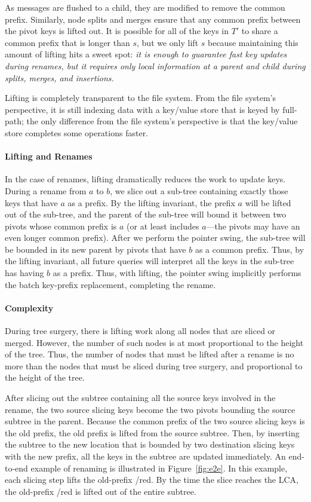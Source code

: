 As messages are flushed to a child, they
are modified to remove the common prefix.
Similarly, node splits and merges ensure that
any common prefix between the pivot keys is lifted out.
It is possible for all of the keys in $T'$ to
share a common prefix that is longer than $s$,  but we only lift
$s$ because maintaining this amount of lifting hits a sweet spot: \textit{it
is enough to guarantee fast key updates during renames, but it
requires only local information at a parent and child  
during splits, merges, and insertions.}

Lifting  is completely transparent to the file system.
From the file system's perspective, it is still indexing data with a
key/value store that is keyed by full-path; the only difference from the file
system's perspective is that the key/value store completes some
operations faster.

\paragraph{Lifting and Renames}
In the case of renames, lifting dramatically reduces the work to update
keys.  During a rename from $a$ to $b$, we slice out a sub-tree
containing exactly those keys that have $a$ as a prefix.  By the
lifting invariant, the prefix $a$ will be lifted out of the sub-tree,
and the parent of the sub-tree will bound it between two pivots whose
common prefix is $a$ (or at least includes $a$---the pivots may have
an even longer common prefix).  After we perform the pointer swing,
the sub-tree will be bounded in its new parent by pivots that have $b$
as a common prefix.  Thus, by the lifting invariant, all future queries
will interpret all the keys in the sub-tree has having $b$ as a prefix.
Thus, with lifting, the pointer swing implicitly performs the batch key-prefix
replacement, completing the rename.

\paragraph{Complexity} During tree surgery, there is lifting work
along all nodes that are sliced or merged.  However, the number of
such nodes is at most proportional to the height of the tree.
Thus, the number of nodes that must be lifted after a rename is no more than
the nodes that must be sliced during tree surgery, and proportional to the height
of the tree.

After slicing out the subtree containing all the source keys involved in the rename,
the two source slicing keys become the two pivots bounding the source subtree in the
parent.
Because the common prefix of the two source slicing keys is the old prefix,
the old prefix is lifted from the source subtree.
Then, by inserting the subtree
to the new location that is bounded by two destination slicing keys with the new prefix,
all the keys in the subtree are updated immediately.
An end-to-end example of renaming is illustrated in Figure~\ref{fig:e2e}.
In this example, each slicing step lifts the old-prefix /red. By the time the slice reaches the LCA,
the old-prefix /red is lifted out of the entire subtree.

